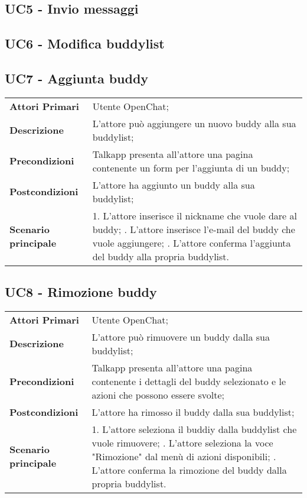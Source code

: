 
\subsection{UC5 - Invio messaggi}

\subsection{UC6 - Modifica buddylist}

\subsection{UC7 - Aggiunta buddy}
\begin{center}
	\bgroup
	\def\arraystretch{1.8}     
	\begin{longtable}{  p{4cm} | p{9.5cm} } 
		\textbf{Attori Primari} & Utente OpenChat; \\ 
		\textbf{Descrizione} &  L'attore può aggiungere un nuovo buddy alla sua buddylist; \\ 
		\textbf{Precondizioni}  & Talkapp presenta all'attore una pagina contenente un form per l'aggiunta di un buddy; \\
		\textbf{Postcondizioni} & L'attore ha aggiunto un buddy alla sua buddylist;  \\ 
		\textbf{Scenario principale} & 
		1. L'attore inserisce il nickname che vuole dare al buddy; \newline
		2. L'attore inserisce l'e-mail del buddy che vuole aggiungere; \newline
		3. L'attore conferma l'aggiunta del buddy alla propria buddylist.
	\end{longtable}
	\egroup
\end{center}

\subsection{UC8 - Rimozione buddy}
\begin{center}
	\bgroup
	\def\arraystretch{1.8}     
	\begin{longtable}{  p{4cm} | p{9.5cm} } 
		\textbf{Attori Primari} & Utente OpenChat; \\ 
		\textbf{Descrizione} &  L'attore può rimuovere un buddy dalla sua buddylist; \\ 
		\textbf{Precondizioni}  & Talkapp presenta all'attore una pagina contenente i dettagli del buddy selezionato e le azioni che possono essere svolte; \\
		\textbf{Postcondizioni} & L'attore ha rimosso il buddy dalla sua buddylist;  \\ 
		\textbf{Scenario principale} & 
		1. L'attore seleziona il buddiy dalla buddylist che vuole rimuovere; \newline
		2. L'attore seleziona la voce "Rimozione" dal menù di azioni disponibili; \newline
		3. L'attore conferma la rimozione del buddy dalla propria buddylist.
	\end{longtable}
	\egroup
\end{center}

